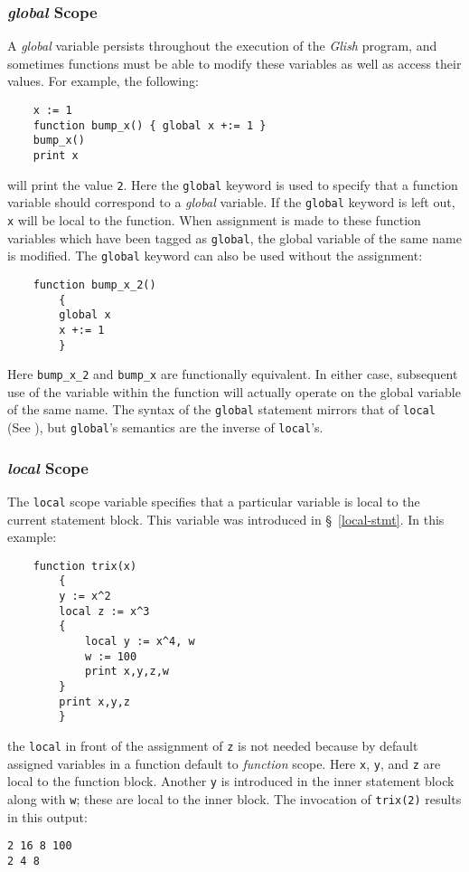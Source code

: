 \subsubsection{{\em global} Scope}
A {\em global} variable persists throughout the execution of the
{\em Glish} program, and sometimes functions must be able to 
modify these variables
as well as access their values. For example, the following:
\begin{verbatim}
    x := 1
    function bump_x() { global x +:= 1 }
    bump_x()
    print x
\end{verbatim}
will print the value {\tt 2}. Here the {\tt global} keyword is used to specify
that a function variable should correspond to a {\em global} variable.
If the {\tt global} keyword is left out, {\tt x} will be local
to the function. When assignment is made to these function variables which
have been tagged as {\tt global}, the global variable of the same name is
modified. The {\tt global} keyword can also be used without the assignment:
\begin{verbatim}
    function bump_x_2()
        {
        global x
        x +:= 1
        }
\end{verbatim}
Here \verb+bump_x_2+ and \verb+bump_x+ are functionally equivalent. 
In either case,
subsequent use of the variable within the function will actually operate on
the global variable of the same name. The syntax of the {\tt global} statement
mirrors that of {\tt local} (See ), but {\tt global}'s
semantics are the inverse of {\tt local}'s.

\subsubsection{{\em local} Scope}
The {\tt local} scope variable specifies that a particular variable
is local to the current statement block.  This variable was introduced
in \S~\ref{local-stmt}.  In this example:
\begin{verbatim}
    function trix(x)
        {
        y := x^2
        local z := x^3
        {
            local y := x^4, w
            w := 100
            print x,y,z,w
        }
        print x,y,z
        }
\end{verbatim}
the {\tt local} in front of the assignment of {\tt z} is not needed because
by default assigned variables in a function default to {\em function}
scope. 
Here {\tt x}, {\tt y}, and {\tt z} are local
to the function block. Another {\tt y} is introduced in the inner statement
block along with {\tt w}; these are local to the inner block. The invocation
of {\tt trix(2)} results in this output:
\begin{verbatim}
2 16 8 100
2 4 8
\end{verbatim}

